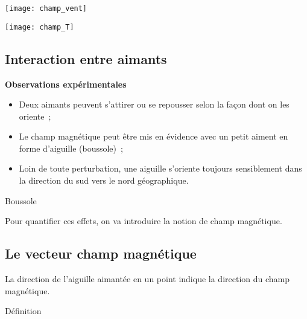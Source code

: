 \documentclass[../main/main.tex]{subfiles}
\begin{document}
\noindent
\begin{minipage}[t]{.5\linewidth}
  \centering
  \texttt{[image: champ\_vent]}
  \label{fig:chpvent}
\end{minipage}
\hfill
\begin{minipage}[t]{.5\linewidth}
  \centering
  \texttt{[image: champ\_T]}
  \label{fig:chpT}
\end{minipage}

\subsection{Interaction entre aimants}
\textbf{Observations expérimentales}
\begin{itemize}[label=$\diamond$, leftmargin=10pt]
  \item Deux aimants peuvent s'attirer ou se repousser selon la façon dont on
    les oriente~;
  \item Le champ magnétique peut être mis en évidence avec un petit aiment en
    forme d'aiguille (boussole)~;
  \item Loin de toute perturbation, une aiguille s'oriente toujours sensiblement
    dans la direction du sud vers le nord géographique.
\end{itemize}
\begin{tdefi}{Boussole}
  \begin{center}
  \end{center}
\end{tdefi}
Pour quantifier ces effets, on va introduire la notion de champ magnétique.

\subsection{Le vecteur champ magnétique}
La direction de l'aiguille aimantée en un point indique la direction du champ
magnétique.
\begin{tdefi}{Définition}
\end{tdefi}
\end{document}
